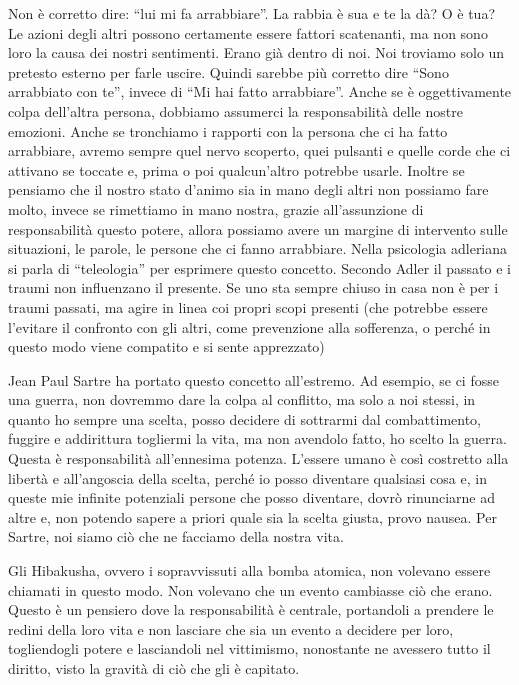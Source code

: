 \documentclass[12pt]{book} %
\begin{document}
Non è corretto dire: “lui mi fa arrabbiare”. La rabbia è sua e te la dà? O è tua? Le azioni degli altri possono
certamente essere fattori scatenanti, ma non sono loro la causa dei nostri sentimenti. Erano già dentro di noi. Noi
troviamo solo un pretesto esterno per farle uscire. Quindi sarebbe più corretto dire “Sono arrabbiato con te”, invece
di “Mi hai fatto arrabbiare”. Anche se è oggettivamente colpa dell'altra persona, dobbiamo assumerci la responsabilità delle nostre emozioni. Anche se tronchiamo i rapporti con la persona che ci ha fatto arrabbiare, avremo sempre quel nervo scoperto, quei pulsanti e quelle corde che ci attivano se toccate e, prima o poi qualcun'altro potrebbe usarle. Inoltre se pensiamo che il nostro stato d'animo sia in mano degli altri non possiamo fare molto, invece se rimettiamo in mano nostra, grazie all'assunzione di responsabilità questo potere, allora possiamo avere un margine di intervento sulle situazioni, le parole, le persone che ci fanno arrabbiare.
Nella psicologia adleriana si parla di “teleologia” per esprimere questo concetto.
Secondo Adler il passato e i traumi non influenzano il presente. Se uno sta sempre chiuso in casa non è per i traumi
passati, ma agire in linea coi propri scopi presenti (che potrebbe essere l'evitare il confronto
con gli altri, come prevenzione alla sofferenza, o perché in questo modo viene compatito e si sente apprezzato)\newline


Jean Paul Sartre ha portato questo concetto all'estremo. Ad esempio, se ci fosse una guerra, non
dovremmo dare la colpa al conflitto, ma solo a noi stessi, in quanto ho sempre una scelta, posso decidere di sottrarmi
dal combattimento, fuggire e addirittura togliermi la vita, ma non avendolo fatto, ho scelto la guerra. Questa è
responsabilità all'ennesima potenza. L'essere umano è così costretto alla libertà e all'angoscia
della scelta, perché io posso diventare qualsiasi cosa e, in queste mie infinite potenziali persone che posso
diventare, dovrò rinunciarne ad altre e, non potendo sapere a priori quale sia la scelta giusta, provo nausea. Per
Sartre, noi siamo ciò che ne facciamo della nostra vita.


\bigskip

Gli Hibakusha, ovvero i sopravvissuti alla bomba atomica, non volevano essere chiamati in questo modo. Non volevano che
un evento cambiasse ciò che erano. Questo è un pensiero dove la responsabilità è centrale, portandoli a prendere le
redini della loro vita e non lasciare che sia un evento a decidere per loro, togliendogli potere e lasciandoli nel
vittimismo, nonostante ne avessero tutto il diritto, visto la gravità di ciò che gli è capitato. 
\end{document}
